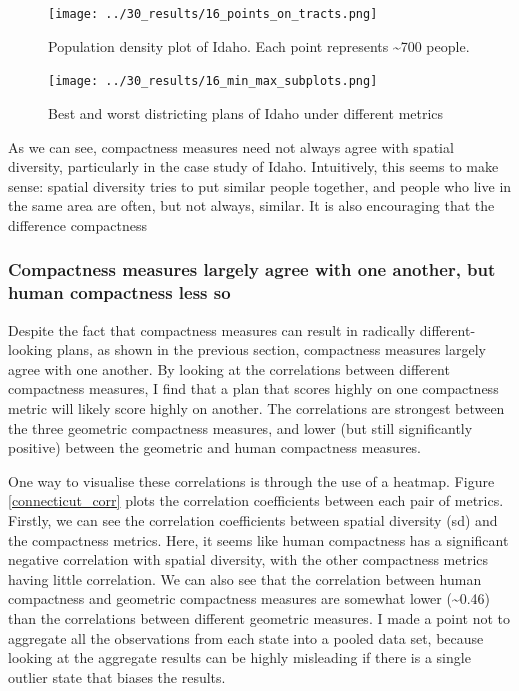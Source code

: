 \documentclass[]{article}
\begin{document}
\begin{figure}
\centering
\texttt{[image: ../30\_results/16\_points\_on\_tracts.png]}
\caption{Population density plot of Idaho. Each point represents
\textasciitilde{}700 people. \label{idaho_density}}
\end{figure}

\begin{figure}
\centering
\texttt{[image: ../30\_results/16\_min\_max\_subplots.png]}
\caption{Best and worst districting plans of Idaho under different
metrics \label{idaho_minmax}}
\end{figure}

As we can see, compactness measures need not always agree with spatial
diversity, particularly in the case study of Idaho. Intuitively, this
seems to make sense: spatial diversity tries to put similar people
together, and people who live in the same area are often, but not
always, similar. It is also encouraging that the difference compactness

\hypertarget{compactness-measures-largely-agree-with-one-another-but-human-compactness-less-so}{%
\subsubsection{Compactness measures largely agree with one another, but
human compactness less
so}\label{compactness-measures-largely-agree-with-one-another-but-human-compactness-less-so}}

Despite the fact that compactness measures can result in radically
different-looking plans, as shown in the previous section, compactness
measures largely agree with one another. By looking at the correlations
between different compactness measures, I find that a plan that scores
highly on one compactness metric will likely score highly on another.
The correlations are strongest between the three geometric compactness
measures, and lower (but still significantly positive) between the
geometric and human compactness measures.

One way to visualise these correlations is through the use of a heatmap.
Figure \ref{connecticut_corr} plots the correlation coefficients between
each pair of metrics. Firstly, we can see the correlation coefficients
between spatial diversity (sd) and the compactness metrics. Here, it
seems like human compactness has a significant negative correlation with
spatial diversity, with the other compactness metrics having little
correlation. We can also see that the correlation between human
compactness and geometric compactness measures are somewhat lower
(\textasciitilde{}0.46) than the correlations between different
geometric measures. I made a point not to aggregate all the observations
from each state into a pooled data set, because looking at the aggregate
results can be highly misleading if there is a single outlier state that
biases the results.
\end{document}
